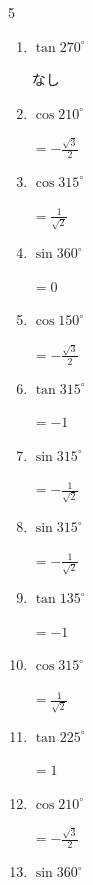 \begin{multicols}{5}
\begin{enumerate}
        $\displaystyle =0$

  \item $\displaystyle \tan{270^\circ}$

        $\displaystyle なし$

  \item $\displaystyle \cos{210^\circ}$

        $\displaystyle =-\frac{\sqrt{3}}{2}$

  \item $\displaystyle \cos{315^\circ}$

        $\displaystyle =\frac{1}{\sqrt{2}}$

  \item $\displaystyle \sin{360^\circ}$

        $\displaystyle =0$

  \item $\displaystyle \cos{150^\circ}$

        $\displaystyle =-\frac{\sqrt{3}}{2}$

  \item $\displaystyle \tan{315^\circ}$

        $\displaystyle =-1$

  \item $\displaystyle \sin{315^\circ}$

        $\displaystyle =-\frac{1}{\sqrt{2}}$

  \item $\displaystyle \sin{315^\circ}$

        $\displaystyle =-\frac{1}{\sqrt{2}}$

  \item $\displaystyle \tan{135^\circ}$

        $\displaystyle =-1$

\columnbreak %

  \item $\displaystyle \cos{315^\circ}$

        $\displaystyle =\frac{1}{\sqrt{2}}$

  \item $\displaystyle \tan{225^\circ}$

        $\displaystyle =1$

  \item $\displaystyle \cos{210^\circ}$

        $\displaystyle =-\frac{\sqrt{3}}{2}$

  \item $\displaystyle \sin{360^\circ}$


\end{enumerate}
\end{multicols}
